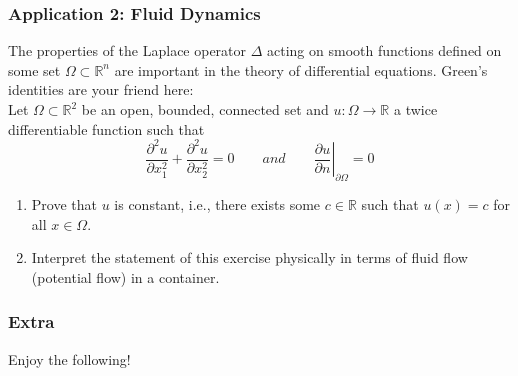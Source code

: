 \documentclass[11pt, t]{beamer}
\newcommand{\nullspace}{~\\[15pt]}
\begin{document}
\begin{frame}
    \frametitle{Application 2: Fluid Dynamics}
    The properties of the Laplace operator $\Delta$ acting on smooth functions defined on some set $\Omega \subset \mathbb{R}^{n}$ are important in the theory of differential equations. Green's identities are your friend here:
    \nullspace
    Let $\Omega \subset \mathbb{R}^{2}$ be an open, bounded, connected set and $u: \Omega \rightarrow \mathbb{R}$ a twice differentiable function such that
    \[
        \frac{\partial^{2} u}{\partial x_{1}^{2}}+\frac{\partial^{2} u}{\partial x_{2}^{2}}=0
    \qquad and \qquad
        \left.\frac{\partial u}{\partial n}\right|_{\partial \Omega}=0
    \]
    \begin{enumerate}
        \item Prove that $u$ is constant, i.e., there exists some $c \in \mathbb{R}$ such that $u(x)=c$ for all $x \in \Omega$.
        \item Interpret the statement of this exercise physically in terms of fluid flow (potential flow) in a container.
    \end{enumerate}
\end{frame}

\begin{frame}
    \frametitle{Extra}
    \vfill
    \begin{center}
        \LARGE
        Enjoy the following!
    \end{center}
    \vfill
\end{frame}
\end{document}
